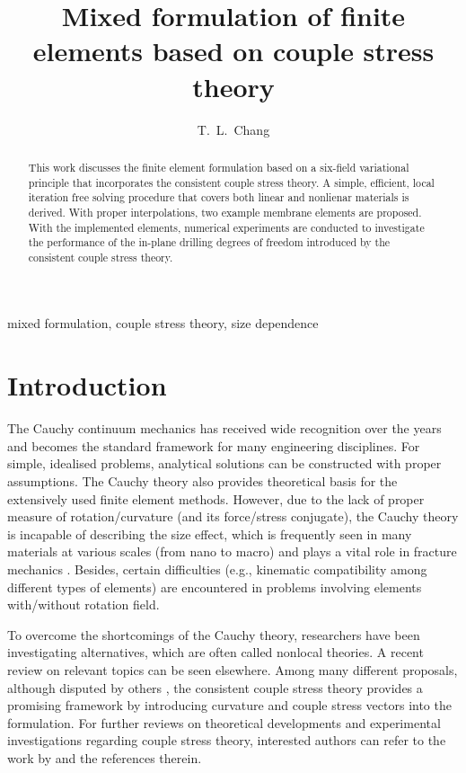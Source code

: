 \documentclass[3p,sort&compress,11pt,fleqn]{elsarticle}
\begin{document}
\begin{abstract}
This work discusses the finite element formulation based on a six-field variational principle that incorporates the consistent couple stress theory. A simple, efficient, local iteration free solving procedure that covers both linear and nonlienar materials is derived. With proper interpolations, two example membrane elements are proposed. With the implemented elements, numerical experiments are conducted to investigate the performance of the in-plane drilling degrees of freedom introduced by the consistent couple stress theory.
\end{abstract}
\begin{keyword}
mixed formulation\sep
couple stress theory\sep
size dependence
\end{keyword}
\begin{frontmatter}
\title{Mixed formulation of finite elements based on couple stress theory}
\author[]{T.~L.~Chang}
\address{Department of Civil and Natural Resources Engineering, University of Canterbury, Christchurch, New Zealand, 8041.}
\end{frontmatter}
\section{Introduction}
The Cauchy continuum mechanics has received wide recognition over the years and becomes the standard framework for many engineering disciplines. For simple, idealised problems, analytical solutions can be constructed \citep[see, e.g.,][]{Timoshenko2010} with proper assumptions. The Cauchy theory also provides theoretical basis for the extensively used finite element methods. However, due to the lack of proper measure of rotation/curvature (and its force/stress conjugate), the Cauchy theory is incapable of describing the size effect, which is frequently seen in many materials at various scales (from nano to macro) and plays a vital role in fracture mechanics \citep{Bazant1984}. Besides, certain difficulties (e.g., kinematic compatibility among different types of elements) are encountered in problems involving elements with/without rotation field.

To overcome the shortcomings of the Cauchy theory, researchers have been investigating alternatives, which are often called nonlocal theories. A recent review \citep{Shaat2020} on relevant topics can be seen elsewhere. Among many different proposals, although disputed by others \citep{Neff2016}, the consistent couple stress theory \citep{Hadjesfandiari2011} provides a promising framework by introducing curvature and couple stress vectors into the formulation. For further reviews on theoretical developments and experimental investigations regarding couple stress theory, interested authors can refer to the work by \citet{Pedgaonkar2021} and the references therein.
\end{document}
